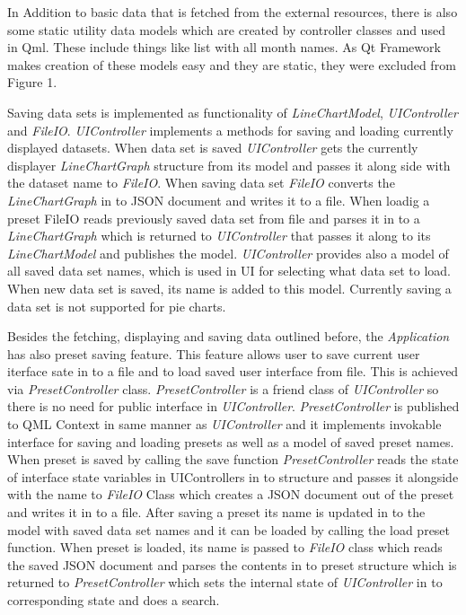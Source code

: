 \documentclass{article}
\begin{document}
In Addition to basic data that is fetched from the external resources, there is also some static utility data models which are created by controller classes and used in Qml. These include things like list with all month names. As Qt Framework makes creation of these models easy and they are static, they were excluded from Figure 1. 

Saving data sets is implemented as functionality of \emph{LineChartModel}, \emph{UIController} and \emph{FileIO}. \emph{UIController} implements a methods for saving and loading currently displayed datasets. When data set is saved \emph{UIController} gets the currently displayer \emph{LineChartGraph} structure from its model and passes it along side with the dataset name to \emph{FileIO}. When saving data set \emph{FileIO} converts the \emph{LineChartGraph} in to JSON document and writes it to a file. When loadig a preset FileIO reads previously saved data set from file and parses it in to a \emph{LineChartGraph} which is returned to \emph{UIController} that passes it along to its \emph{LineChartModel} and publishes the model. \emph{UIController} provides also a model of all saved data set names, which is used in UI for selecting what data set to load. When new data set is saved, its name is added to this model. Currently saving a data set is not supported for pie charts.

Besides the fetching, displaying and saving data outlined before, the \emph{Application} has also preset saving feature. This feature allows user to save current user iterface sate in to a file and to load saved user interface from file. This is achieved via \emph{PresetController} class. \emph{PresetController} is a friend class of \emph{UIController} so there is no need for public interface in \emph{UIController}. \emph{PresetController}  is published to QML Context in same manner as \emph{UIController} and it implements invokable interface for saving and loading presets as well as a model of saved preset names. When preset is saved by calling the save function \emph{PresetController} reads the state of interface state variables in UIControllers in to structure and passes it alongside with the name to \emph{FileIO} Class which creates a JSON document out of the preset and writes it in to a file. After saving a preset its name is updated in to the model with saved data set names and it can be loaded by calling the load preset function. When preset is loaded, its name is passed to \emph{FileIO} class which reads the saved JSON document and parses the contents in to preset structure which is returned to \emph{PresetController} which sets the internal state of \emph{UIController} in to corresponding state and does a search.
\end{document}
